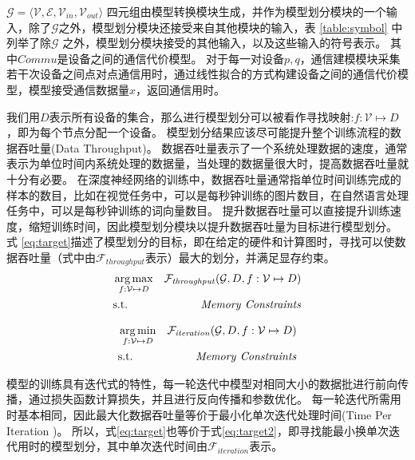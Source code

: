 

$\mathcal{G}=\langle \mathcal{V}, \mathcal{E}, \mathcal{V}_{\mathit{in}}, \mathcal{V}_{\mathit{out}} \rangle $ 四元组由模型转换模块生成，并作为模型划分模块的一个输入，除了$\mathcal{G}$之外，模型划分模块还接受来自其他模块的输入，表 \ref{table:symbol} 中列举了除$\mathcal{G}$ 之外，模型划分模块接受的其他输入，以及这些输入的符号表示。
其中$\mathit{Commu}$是设备之间的通信代价模型。
对于每一对设备$p, q$，通信建模模块采集若干次设备之间点对点通信用时，通过线性拟合的方式构建设备之间的通信代价模型，模型接受通信数据量$x$，返回通信用时。

我们用$D$表示所有设备的集合，那么进行模型划分可以被看作寻找映射:$f: \mathcal{V}\mapsto D$，即为每个节点分配一个设备。
模型划分结果应该尽可能提升整个训练流程的数据吞吐量(Data Throughput)。
数据吞吐量表示了一个系统处理数据的速度，通常表示为单位时间内系统处理的数据量，当处理的数据量很大时，提高数据吞吐量就十分有必要。
在深度神经网络的训练中，数据吞吐量通常指单位时间训练完成的样本的数目，比如在视觉任务中，可以是每秒钟训练的图片数目，在自然语言处理任务中，可以是每秒钟训练的词向量数目。
提升数据吞吐量可以直接提升训练速度，缩短训练时间，因此模型划分模块以提升数据吞吐量为目标进行模型划分。
式 \ref{eq:target}描述了模型划分的目标，即在给定的硬件和计算图时，寻找可以使数据吞吐量（式中由$\mathcal{F}_{\mathit{throughput}}$表示）最大的划分，并满足显存约束。
\begin{equation}
	\label{eq:target}
	\begin{aligned}
		& \operatorname*{arg\,max}_{f:\mathcal{V}\mapsto D} & \mathcal{F}_{\mathit{throughput}}(\mathcal{G}, D, f:\mathcal{V}\mapsto D) \\
		& \mathrm{s.t.} &\mathit{Memory}\ \mathit{Constraints}
	\end{aligned}
\end{equation}

\begin{equation}
	\label{eq:target2}
	\begin{aligned}
		& \operatorname*{arg\,min}_{f:\mathcal{V}\mapsto D} & \mathcal{F}_{\mathit{iteration}}(\mathcal{G}, D, f:\mathcal{V}\mapsto D) \\
		& \mathrm{s.t.} &\mathit{Memory}\ \mathit{Constraints}
	\end{aligned}
\end{equation}

模型的训练具有迭代式的特性，每一轮迭代中模型对相同大小的数据批进行前向传播，通过损失函数计算损失，并且进行反向传播和参数优化。
每一轮迭代所需用时基本相同，因此最大化数据吞吐量等价于最小化单次迭代处理时间(Time Per Iteration )。
所以，式\ref{eq:target}也等价于式\ref{eq:target2}，即寻找能最小换单次迭代用时的模型划分，其中单次迭代时间由$\mathcal{F}_{\mathit{iteration}}$表示。

